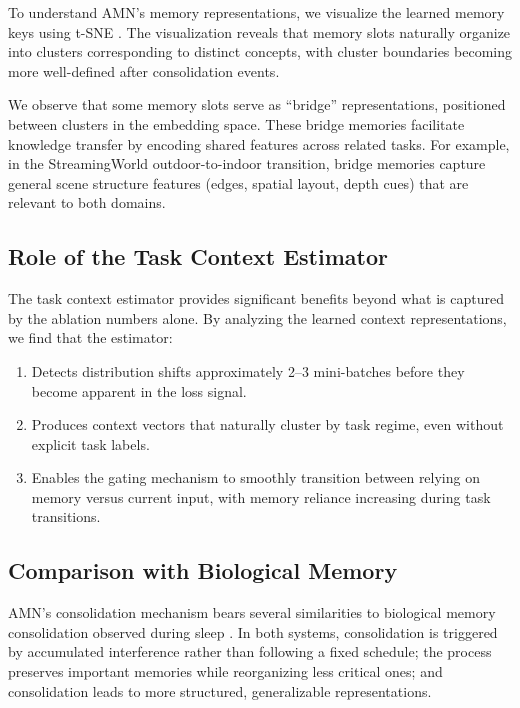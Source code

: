 \documentclass[11pt]{article}
\begin{document}
To understand AMN's memory representations, we visualize the learned memory keys using t-SNE \citep{maaten2008visualizing}. The visualization reveals that memory slots naturally organize into clusters corresponding to distinct concepts, with cluster boundaries becoming more well-defined after consolidation events.

We observe that some memory slots serve as ``bridge'' representations, positioned between clusters in the embedding space. These bridge memories facilitate knowledge transfer by encoding shared features across related tasks. For example, in the StreamingWorld outdoor-to-indoor transition, bridge memories capture general scene structure features (edges, spatial layout, depth cues) that are relevant to both domains.

\subsection{Role of the Task Context Estimator}

The task context estimator provides significant benefits beyond what is captured by the ablation numbers alone. By analyzing the learned context representations, we find that the estimator:
\begin{enumerate}
    \item Detects distribution shifts approximately 2--3 mini-batches before they become apparent in the loss signal.
    \item Produces context vectors that naturally cluster by task regime, even without explicit task labels.
    \item Enables the gating mechanism to smoothly transition between relying on memory versus current input, with memory reliance increasing during task transitions.
\end{enumerate}

\subsection{Comparison with Biological Memory}

AMN's consolidation mechanism bears several similarities to biological memory consolidation observed during sleep \citep{walker2017sleep}. In both systems, consolidation is triggered by accumulated interference rather than following a fixed schedule; the process preserves important memories while reorganizing less critical ones; and consolidation leads to more structured, generalizable representations.
\end{document}
